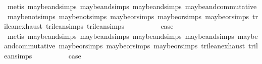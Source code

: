 \begin{isabellebody}
\ {\isacharparenleft}metis\ maybe{\isacharunderscore}and{\isachardot}simps{\isacharparenleft}{}{\isacharparenright}\ maybe{\isacharunderscore}and{\isachardot}simps{\isacharparenleft}{}{\isacharparenright}\ maybe{\isacharunderscore}and{\isachardot}simps{\isacharparenleft}{}{\isacharparenright}\ maybe{\isacharunderscore}and{\isacharunderscore}commutative\ maybe{\isacharunderscore}not{\isachardot}simps{\isacharparenleft}{}{\isacharparenright}\ maybe{\isacharunderscore}not{\isachardot}simps{\isacharparenleft}{}{\isacharparenright}\ maybe{\isacharunderscore}or{\isachardot}simps{\isacharparenleft}{}{\isacharparenright}\ maybe{\isacharunderscore}or{\isachardot}simps{\isacharparenleft}{}{\isacharparenright}\ maybe{\isacharunderscore}or{\isachardot}simps{\isacharparenleft}{}{\isacharparenright}\ trilean{\isachardot}exhaust\ trilean{\isachardot}simps{\isacharparenleft}{}{\isacharparenright}\ trilean{\isachardot}simps{\isacharparenleft}{}{\isacharparenright}{\isacharparenright}\isanewline
{}\isamarkupfalse%
\isanewline
\ \ \isamarkupfalse%
\ {\isachardoublequoteopen}{}{\isacharunderscore}{}{\isachardoublequoteclose}\isanewline
\ \ \isamarkupfalse%
\ \isamarkupfalse%
\ {\isacharquery}case\isanewline
\ \ \ \ \isamarkupfalse%
\ {\isacharparenleft}metis\ maybe{\isacharunderscore}and{\isachardot}simps{\isacharparenleft}{}{\isacharparenright}\ maybe{\isacharunderscore}and{\isachardot}simps{\isacharparenleft}{}{\isacharparenright}\ maybe{\isacharunderscore}and{\isachardot}simps{\isacharparenleft}{}{\isacharparenright}\ maybe{\isacharunderscore}and{\isachardot}simps{\isacharparenleft}{}{\isacharparenright}\ maybe{\isacharunderscore}and{\isacharunderscore}commutative\ maybe{\isacharunderscore}or{\isachardot}simps{\isacharparenleft}{}{\isacharparenright}\ maybe{\isacharunderscore}or{\isachardot}simps{\isacharparenleft}{}{\isacharparenright}\ maybe{\isacharunderscore}or{\isachardot}simps{\isacharparenleft}{}{\isacharparenright}\ trilean{\isachardot}exhaust\ trilean{\isachardot}simps{\isacharparenleft}{}{\isacharparenright}{\isacharparenright}\isanewline
{}\isamarkupfalse%
\isanewline
\ \ \isamarkupfalse%
\ {}\isanewline
\ \ \isamarkupfalse%
\ \isamarkupfalse%
\ {\isacharquery}case\isanewline

\end{isabellebody}

